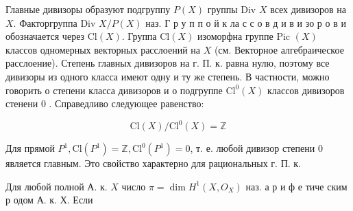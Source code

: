 \documentclass[10pt]{article}
\begin{document}
Главные дивизоры образуют подгруппу $P(X)$ группы Div $X$ всех дивизоров на $X$. Факторгруппа Div $X / P(X)$ наз. Г р у п п о й к ла с с о в д и в и зо р о в и обозначается через $\mathrm{Cl}(X)$. Группа $\mathrm{Cl}(X)$ изоморфна группе Pic $(X)$ классов одномерных векторных расслоений на $X$ (см. Векторное алгебраическое расслоение). Степень главных дивизоров на г. П. к. равна нулю, поэтому все дивизоры из одного класса имеют одну и ту же степень. В частности, можно говорить о степени класса дивизоров и о подгруппе $\mathrm{Cl}^{0}(X)$ классов дивизоров стенени 0 . Справедливо следующее равенство:



\[

\mathrm{Cl}(X) / \mathrm{Cl}^{0}(X)=\mathbb{Z}

\]



Для прямой $P^{1}, \mathrm{Cl}\left(P^{1}\right)=\mathbb{Z}, \mathrm{Cl}^{0}\left(P^{1}\right)=0$, т. е. любой дивизор степени 0 является главным. Это свойство характерно для рациональных г. П. к.



Для любой полной А. к. $X$ число $\pi=\operatorname{dim} H^{1}\left(X, O_{X}\right)$ наз. а р и ф е тиче ским р одом А. к. $Х$. Если
\end{document}
